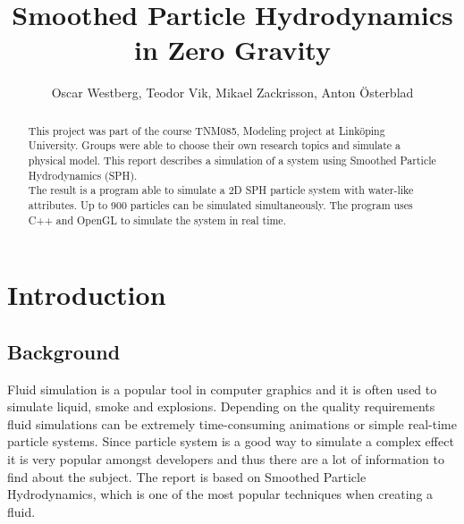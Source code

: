 \documentclass[a4paper,12pt,twoside,final]{report}
\begin{document}
\pagestyle{plain}


\title{Smoothed Particle Hydrodynamics in Zero Gravity}
\author{Oscar Westberg, Teodor Vik, Mikael Zackrisson, Anton Österblad}
\maketitle

\thispagestyle{empty}
\newpage{}

\setcounter{page}{2}
\renewcommand{\abstractname}{Summary}
\begin{abstract}
This project was part of the course TNM085, Modeling project at Linköping University. Groups were able to choose their own research topics and simulate a physical model. This report describes a simulation of a system using Smoothed Particle Hydrodynamics (SPH). \\

\noindent The result is a program able to simulate a 2D SPH particle system with water-like attributes. Up to 900 particles can be simulated simultaneously. The program uses C++ and OpenGL to simulate the system in real time.
\vfill
\end{abstract}
\newpage{}

\tableofcontents  %
\listoffigures    %
\listoftables     %


\chapter{Introduction}


\section{Background}
Fluid simulation is a popular tool in computer graphics and it is often used to simulate liquid, smoke and explosions. Depending on the quality requirements fluid simulations can be extremely time-consuming animations or simple real-time particle systems. Since particle system is a good way to simulate a complex effect it is very popular amongst developers and thus there are a lot of information to find about the subject. The report is based on Smoothed Particle Hydrodynamics, which is one of the most popular techniques when creating a fluid.
\end{document}
